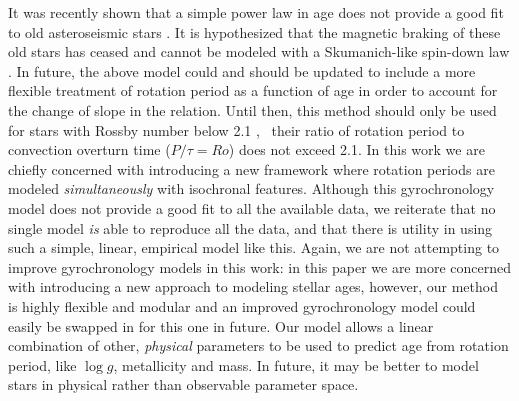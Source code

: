 It was recently shown that a simple power law in age does not provide a good
fit to old asteroseismic stars \citep{Angus2015, vansaders2016}.
It is hypothesized that the magnetic braking of these old stars has ceased and
cannot be modeled with a Skumanich-like spin-down law \citep{vansaders2016}.
In future, the above model could and should be updated to include a more
flexible treatment of rotation period as a function of age in order to account
for the change of slope in the relation.
Until then, this method should only be used for stars with Rossby number below
2.1 \citep{vansaders2016}, \ie\ their ratio of rotation period to convection
overturn time ($P/\tau = Ro$) does not exceed 2.1.
In this work we are chiefly concerned with introducing a new framework where
rotation periods are modeled {\it simultaneously} with isochronal features.
Although this gyrochronology model does not provide a good fit to all the
available data, we reiterate that no single model {\it is} able to reproduce
all the data, and that there is utility in using such a simple, linear,
empirical model like this.
Again, we are not attempting to improve gyrochronology models in this work: in
this paper we are more concerned with introducing a new approach to modeling
stellar ages, however, our method is highly flexible and modular and an
improved gyrochronology model could easily be swapped in for this one in
future.
Our model allows a linear combination of other, {\it physical} parameters to
be used to predict age from rotation period, like $\log g$, metallicity and
mass.
In future, it may be better to model stars in physical rather than observable
parameter space.

